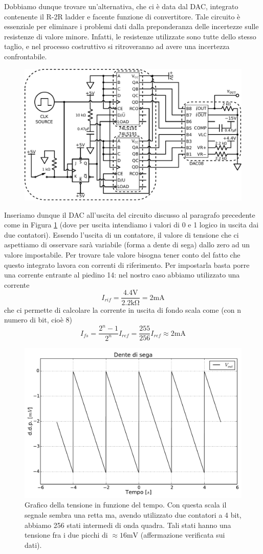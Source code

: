 Dobbiamo dunque trovare un'alternativa, che ci è data dal DAC, integrato contenente il R-2R ladder e facente funzione di convertitore. Tale circuito è essenziale per eliminare i problemi dati dalla preponderanza delle incertezze sulle resistenze di valore minore. Infatti, le resistenze utilizzate sono tutte dello stesso taglio, e nel processo costruttivo si ritroveranno ad avere una incertezza confrontabile.

\begin{figure}[htpc]
\centering
	\includegraphics[width=.7\textwidth]{../E12/latex/DAC.pdf}
	\caption{}
	\label{cir12:dac}
\end{figure}

Inseriamo dunque il DAC all'uscita del circuito discusso al paragrafo precedente come in Figura \ref{cir12:dac} (dove per uscita intendiamo i valori di 0 e 1 logico in uscita dai due contatori). Essendo l'uscita di un contatore, il valore di tensione che ci aspettiamo di osservare sarà variabile (forma a dente di sega) dallo zero ad un valore impostabile. Per trovare tale valore bisogna tener conto del fatto che questo integrato lavora con correnti di riferimento. Per impostarla basta porre una corrente entrante al piedino 14: nel nostro caso abbiamo utilizzato una corrente
$$I_{rif}=\frac{4.4 \si{\volt}}{2.2\si{\kilo\ohm}} = 2 \si{\milli\ampere}$$
che ci permette di calcolare la corrente in uscita di fondo scala come (con n numero di bit, cioè 8)
$$I_{fs}=\frac{2^n-1}{2^n} I_{ref} = \frac{255}{256} I_{ref} \approx 2 \si{\milli\ampere}$$

\begin{figure}[htpc]
\centering
	\includegraphics[width=.65\textwidth]{../E12/latex/sega.pdf}
	\caption{Grafico della tensione in funzione del tempo. Con questa scala il segnale sembra una retta ma, avendo utilizzato due contatori a 4 bit, abbiamo 256 stati intermedi di onda quadra. Tali stati hanno una tensione fra i due picchi di $\approx 16 \si{\milli \volt}$ (affermazione verificata sui dati).}
	\label{fig12:sega}
\end{figure}

